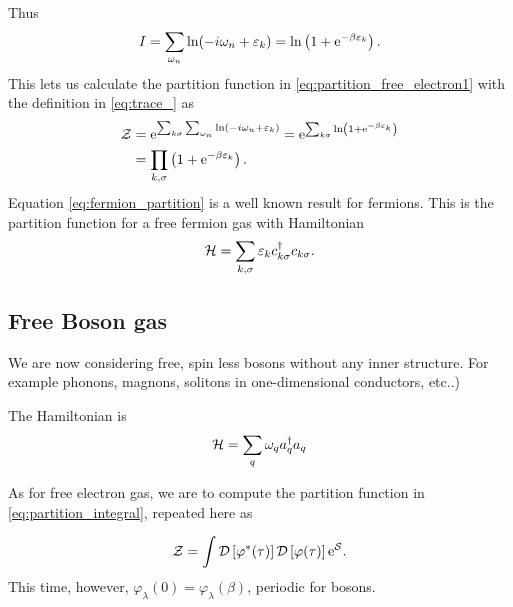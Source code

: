 Thus
\begin{equation}
I = \sum_{\omega_n}\ln(-i\omega_n+\varepsilon_k) = \ln\left(1+\mathrm{e}^{-\beta\varepsilon_k}\right).
\end{equation}
This lets us calculate the partition function in \eqref{eq:partition_free_electron1} with the definition in \eqref{eq:trace_} as
\begin{align}
\mathcal{Z} &= \mathrm{e}^{\sum_{k\sigma}\sum_{\omega_n}\ln(-i\omega_n+\varepsilon_k)} = \mathrm{e}^{\sum_{k\sigma}\ln\left(1+\mathrm{e}^{-\beta\varepsilon_k}\right)}\nonumber \\
&= \prod_{k,\sigma}\left(1+\mathrm{e}^{-\beta\varepsilon_k}\right).\label{eq:fermion_partition}
\end{align}
Equation \eqref{eq:fermion_partition} is a well known result for fermions. This is the partition function for a free fermion gas with Hamiltonian 
\begin{equation}
\mathcal{H} = \sum_{k,\sigma}\varepsilon_kc_{k\sigma}^\dagger c_{k\sigma}.
\end{equation}


\subsection{Free Boson gas}


We are now considering free, spin less bosons without any inner structure. For example phonons, magnons, solitons in one-dimensional conductors, etc..)

The Hamiltonian is 
\begin{equation}
\mathcal{H} = \sum_q \omega_qa_q^\dagger a_q
\end{equation}

As for free electron gas, we are to compute the partition function in \eqref{eq:partition_integral}, repeated here as 

\begin{equation}
\mathcal{Z} = \int \mathcal{D}\left[\varphi^*(\tau)\right]\mathcal{D}\left[\varphi(\tau)\right]\mathrm{e}^{\mathcal{S}}.
\end{equation}
This time, however, $\varphi_\lambda(0) = \varphi_\lambda(\beta)$, periodic for bosons.

